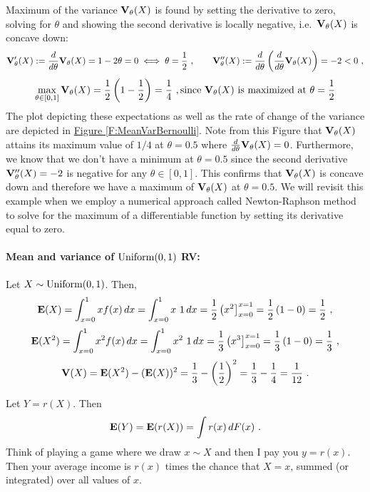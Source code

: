 Maximum of the variance $\mathbf{V}_{\theta}(X)$ is found by setting the derivative to zero, solving for $\theta$ and showing the second derivative is locally negative, i.e.~$\mathbf{V}_{\theta}(X)$ is concave down:
\[
\mathbf{V}_{\theta}'(X) := \frac{d}{d \theta} \mathbf{V}_{\theta}(X) = 1-2 \theta = 0  \iff \theta = \frac{1}{2} \ , 
\qquad \mathbf{V}_{\theta}''(X) := \frac{d}{d \theta} \left( \frac{d}{d \theta} \mathbf{V}_{\theta}(X) \right) = -2 < 0 \ ,
\]
\[
\max_{\theta \in [0,1]} \mathbf{V}_{\theta}(X) = \frac{1}{2} \left(1-\frac{1}{2} \right) = \frac{1}{4} \ , 
\text{since $\mathbf{V}_{\theta}(X)$ is maximized at $\theta = \frac{1}{2}$}
\]
The plot depicting these expectations as well as the rate of change of the variance are depicted in \hyperref[F:MeanVarBernoulli]{Figure \ref*{F:MeanVarBernoulli}}.  Note from this Figure that $\mathbf{V}_{\theta}(X)$ attains its maximum  value of $1/4$ at $\theta=0.5$ where $\frac{d}{d\theta}\mathbf{V}_{\theta}(X)=0$.  Furthermore, we know that we don't have a minimum at $\theta=0.5$ since the second derivative $\mathbf{V}_{\theta}''(X) = -2$ is negative for any $\theta \in [0,1]$.  This confirms that $\mathbf{V}_{\theta}(X)$ is concave down and therefore we have a maximum of $\mathbf{V}_{\theta}(X)$ at $\theta=0.5$.  We will revisit this example when we employ a numerical approach called Newton-Raphson method to solve for the maximum of a differentiable function by setting its derivative equal to zero.

\paragraph{Mean and variance of $\mbox{{\rm Uniform}}(0,1)$ RV:}
Let $X \sim \mbox{{\rm Uniform}}(0,1)$.  Then, 
\[
\mathbf{E}(X) = \int_{x=0}^1 x f(x)\, dx = \int_{x=0}^1 x \ 1 \, dx = \frac{1}{2} \left( x^2 \right]_{x=0}^{x=1} = \frac{1}{2} \left( 1-0 \right) = \frac{1}{2} \ ,
\]
\[
\mathbf{E}(X^2) = \int_{x=0}^1 x^2 f(x)\, dx = \int_{x=0}^1 x^2 \ 1 \, dx =  \frac{1}{3} \left( x^3 \right]_{x=0}^{x=1} = \frac{1}{3} \left( 1-0 \right) = \frac{1}{3} \ ,
\]
\[
\mathbf{V}(X) = \mathbf{E}(X^2) - (\mathbf{E}(X))^2 = \frac{1}{3}  - \left( \frac{1}{2} \right)^2  = \frac{1}{3}  - \frac{1}{4} = \frac{1}{12} \ .
\]

\begin{prop}
Let $Y = r(X)$.  Then
\[
\mathbf{E}(Y) = \mathbf{E}(r(X)) = \int r(x)\, d F(x) \ .
\]
Think of playing a game where we draw $x \sim X$ and then I pay you $y=r(x)$.  Then your average income is $r(x)$ times the chance that $X=x$, summed (or integrated) over all values of $x$.
\end{prop}

